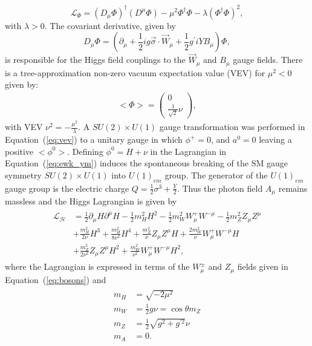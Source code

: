 \begin{equation} \label{eq:ewk_higgs}
\mathcal{L}_{\Phi} = (D_{\mu}\Phi)^{\dagger} (D^{\mu}\Phi) - \mu^2 \Phi^{\dagger}\Phi - \lambda (\Phi^{\dagger}\Phi)^2,
\end{equation}
with $\lambda>0$. The covariant derivative, given by
\begin{equation} \label{eq:higgs_cov}
D_{\mu}\Phi = (\partial_{\mu}+\frac{1}{2}ig\vec{\sigma}\cdot\vec{W}_{\mu}+\frac{1}{2}g^{'}iYB_{\mu})\Phi,
\end{equation}
is responsible for the Higgs field couplings to the $\vec{W}_{\mu}$ and $B_{\mu}$ gauge fields. There is a tree-approximation non-zero vacuum expectation value (VEV) for $\mu^2<0$ given by:
\begin{eqnarray} \label{eq:vev}
<\Phi>  =  \left(\begin{array}{c} 0\\ \frac{1}{\sqrt{2}}\nu \end{array} \right),
\end{eqnarray}    
with VEV $\nu^2= -\frac{\mu^2}{\lambda}$. A $SU(2)\times U(1)$ gauge transformation was performed in Equation~(\ref{eq:vev}) to a unitary gauge in which $\phi^{+}=0$, and $a^{0}=0$ leaving a positive $<\phi^{0}>$. Defining $\phi^{0}=H+\nu$ in the Lagrangian in Equation~(\ref{eq:ewk_ym}) induces the spontaneous breaking of the SM gauge symmetry $SU(2)\times U(1)$ into $U(1)_{em}$ group. The generator of the $U(1)_{em}$ gauge group is the electric charge $Q=\frac{1}{2}\sigma^3+\frac{Y}{2}$. Thus the photon field $A_{\mu}$ remains massless and the Higgs Lagrangian is given by
 \begin{eqnarray} \label{eq:ewk_higgs2}
 \begin{aligned}
\mathcal{L_{H}} &= \frac{1}{2} \partial_{\mu}H\partial^{\mu}H - \frac{1}{2} m_{H}^2 H^2 -\frac{1}{2}m_{W}^2W_{\mu}^{+}W^{-\mu} - \frac{1}{2}m_{Z}^2Z_{\mu}Z^{\mu}  \\
&+ \frac{m_{H}^2}{2\nu} H^3 + \frac{m_{H}^2}{8\nu^2} H^4 + \frac{m_{Z}^2}{\nu} Z_{\mu}Z^{\mu}H + \frac{2m_{W}^2}{\nu} W^{+}_{\mu}W^{-\mu} H  \\
&+ \frac{m_{Z}^2}{2\nu^2} Z_{\mu}Z^{\mu} H^2 +\frac{m_{W}^2}{\nu^2} W^{+}_{\mu}W^{-\mu} H^2,
\end{aligned}
\end{eqnarray}
where the Lagrangian is expressed in terms of the $W_{\mu}^{\pm}$ and $Z_\mu$ fields given in Equation~(\ref{eq:bosons}) and
 \begin{eqnarray} \label{eq:masses}
 \begin{aligned}
m_{H}  &= \sqrt{-2\mu^2} \\
m_{W} &= \frac{1}{2}g\nu = \cos\theta m_{Z} \\
m_{Z} &= \frac{1}{2} \sqrt{g^2+g^{'2}}\nu \\
m_{A} &= 0.
\end{aligned}
\end{eqnarray}
